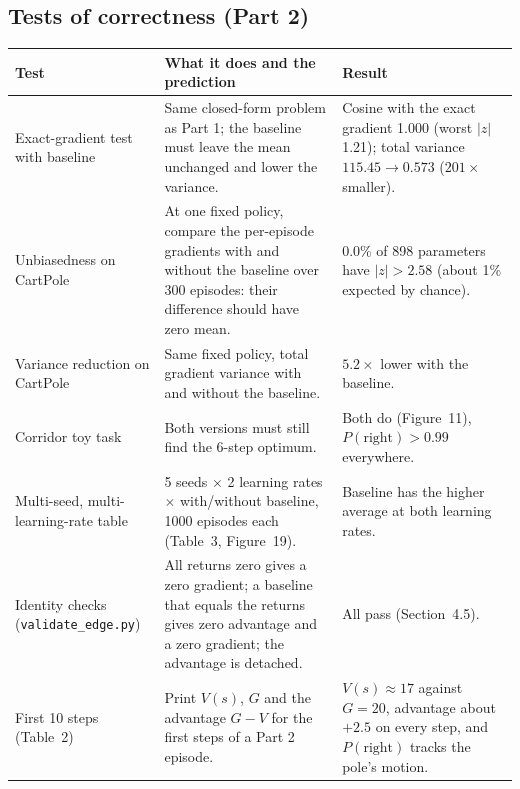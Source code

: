 \documentclass[10pt,a4paper]{article}
\newcommand{\code}[1]{\texttt{#1}}
\newcommand{\hd}[1]{\cellcolor{head}\textbf{#1}}
\begin{document}
\subsection{Tests of correctness (Part 2)}
\begin{longtable}{@{}p{3.6cm}p{7cm}p{6.1cm}@{}}
\hline
\hd{Test} & \hd{What it does and the prediction} & \hd{Result} \\
\hline\endhead
Exact-gradient test with baseline & Same closed-form problem as Part 1; the baseline must leave the mean unchanged and lower the variance. & Cosine with the exact gradient 1.000 (worst $|z|$ 1.21); total variance $115.45\to0.573$ ($201\times$ smaller). \\
Unbiasedness on CartPole & At one fixed policy, compare the per-episode gradients with and without the baseline over 300 episodes: their difference should have zero mean. & 0.0\% of 898 parameters have $|z|>2.58$ (about 1\% expected by chance). \\
Variance reduction on CartPole & Same fixed policy, total gradient variance with and without the baseline. & $5.2\times$ lower with the baseline. \\
Corridor toy task & Both versions must still find the 6-step optimum. & Both do (Figure~11), $P(\text{right})>0.99$ everywhere. \\
Multi-seed, multi-learning-rate table & 5 seeds $\times$ 2 learning rates $\times$ with/without baseline, 1000 episodes each (Table~3, Figure~19). & Baseline has the higher average at both learning rates. \\
Identity checks (\code{validate\_edge.py}) & All returns zero gives a zero gradient; a baseline that equals the returns gives zero advantage and a zero gradient; the advantage is detached. & All pass (Section~4.5). \\
First 10 steps (Table~2) & Print $V(s)$, $G$ and the advantage $G-V$ for the first steps of a Part 2 episode. & $V(s)\approx17$ against $G=20$, advantage about $+2.5$ on every step, and $P(\text{right})$ tracks the pole's motion. \\
\hline
\end{longtable}
\end{document}
